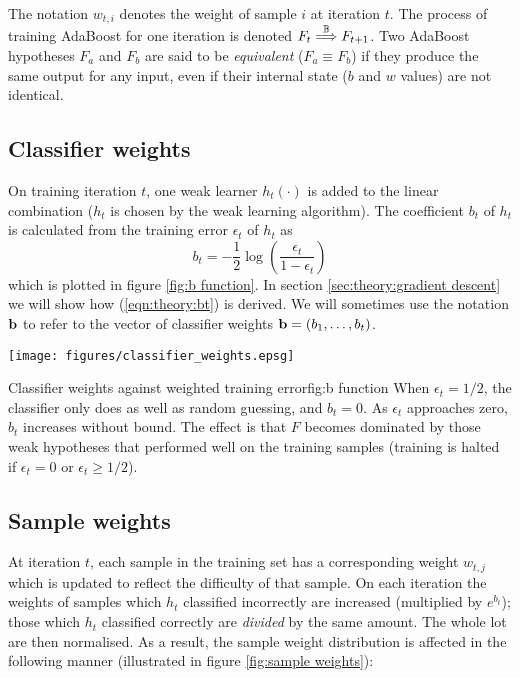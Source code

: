 The notation $w_{t,i}$ denotes the weight of sample $i$ at iteration
$t$.  The process of training AdaBoost for one iteration is denoted $F_t
\stackrel{\mathbb{B}}{\Longrightarrow} F_{t+1}$.   Two AdaBoost hypotheses $F_a$ and $F_b$ are
said to be \emph{equivalent} ($F_a \equiv F_b$) if they produce the
same output for any input, even if their internal state ($b$ and $w$
values) are not identical.

\subsection{Classifier weights}
\label{sec:classifier weights}

On training iteration $t$, one weak learner $h_t(\cdot)$ is added to
the linear combination ($h_t$ is chosen by the weak learning
algorithm).  The coefficient $b_t$ of $h_t$ is calculated from the 
training error $\epsilon_t$ of $h_t$ as 
%
\begin{equation}
b_t = - \frac{1}{2} \log \left( \frac{\epsilon_t}{1 - \epsilon_t} \right)
\label{eqn:theory:bt}
\end{equation}
%
which is plotted in figure \ref{fig:b function}.  In section
\ref{sec:theory:gradient descent} we will show how
(\ref{eqn:theory:bt}) is derived.  We will sometimes use the notation
$\mathbf{b}$ to refer to the vector of classifier weights $\mathbf{b} = (b_1,
\ldots, b_t)$.

\begin{linefigure}
\begin{center}
\texttt{[image: figures/classifier\_weights.epsg]}
\end{center}
\begin{capt}{Classifier weights against weighted training error}{fig:b
function}
When $\epsilon_t = 1/2$, the classifier only does as well as random
guessing, and $b_t = 0$.  As $\epsilon_t$ approaches zero, $b_t$
increases without bound.  The effect is that $F$ becomes dominated by
those weak hypotheses that performed well on the training samples
(training is halted if $\epsilon_t = 0$ or $\epsilon_t \geq
1/2$).
\end{capt}
\end{linefigure}


\subsection{Sample weights}
\label{sec:sample weights}

At iteration $t$, each sample in the training set has a corresponding
weight $w_{t,j}$ which is updated to reflect the difficulty of that
sample.  On each iteration the weights of samples which $h_t$
classified incorrectly are increased (multiplied by $e^{b_t}$); those
which $h_t$ classified correctly are \emph{divided} by the same
amount.  The whole lot are then normalised. As a result, the sample
weight distribution is affected in the following manner (illustrated
in figure \ref{fig:sample weights}): 

